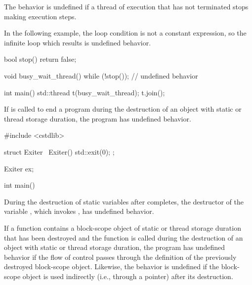 \pnum
The behavior is undefined if a thread of execution
that has not terminated stops making execution steps.

\pnum
\begin{example}
In the following example,
the loop condition 
is not a constant expression,
so the infinite loop
which results
is undefined behavior.
\begin{codeblock}
bool stop() { return false; }

void busy_wait_thread() {
  while (!stop());  // undefined behavior
}

int main() {
  std::thread t(busy_wait_thread);
  t.join();
}
\end{codeblock}
\end{example}


\pnum
If  is called to
end a program during the destruction of an object with static or thread storage duration, the program has
undefined behavior.

\pnum
\begin{example}
\begin{codeblock}
#include <cstdlib>

struct Exiter {
  ~Exiter() { std::exit(0); }
};

Exiter ex;

int main() {}
\end{codeblock}
During the destruction
of static variables
after  completes,
the destructor of the variable ,
which invokes ,
has undefined behavior.
\end{example}


\pnum
If a function contains a block-scope object of static
or thread storage duration that has been destroyed
and the function is called
during the destruction of an object with static or thread storage duration,
the program has undefined behavior if the flow of control
passes through the definition of the previously destroyed block-scope object.
Likewise, the behavior is undefined if the block-scope object
is used indirectly (i.e., through a pointer) after its destruction.

